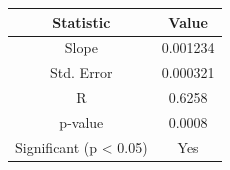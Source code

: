 \begin{center}
\begin{tabular}{cc}
\toprule
  \textbf{Statistic}   & \textbf{Value}  \\
\midrule
        Slope          &    0.001234     \\
      Std. Error       &    0.000321     \\
          R            &     0.6258      \\
       p-value         &     0.0008      \\
Significant (p < 0.05) &      Yes        \\
\bottomrule
\end{tabular}
\end{center}